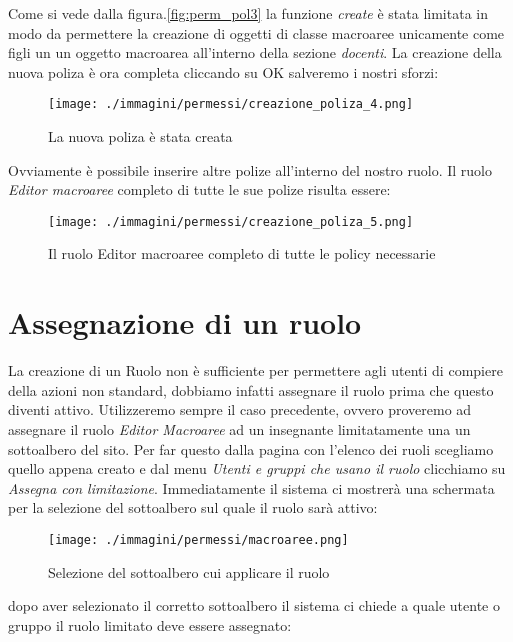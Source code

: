 Come si vede dalla figura.\ref{fig:perm_pol3} la funzione \textsl{create} è stata limitata in modo da permettere la creazione di oggetti di classe macroaree unicamente come figli un un oggetto macroarea all'interno della sezione \textsl{docenti}. La creazione della nuova poliza è ora completa cliccando su OK salveremo i nostri sforzi:
\begin{figure}[H]
 \centering
 \texttt{[image: ./immagini/permessi/creazione\_poliza\_4.png]}
 \caption{La nuova poliza è stata creata}
 \label{fig:perm_pol4}
\end{figure}


Ovviamente è possibile inserire altre polize all'interno del nostro ruolo. Il ruolo \textsl{Editor macroaree} completo di tutte le sue polize risulta essere:
\begin{figure}[H]
 \centering
 \texttt{[image: ./immagini/permessi/creazione\_poliza\_5.png]}
 \caption{Il ruolo Editor macroaree completo di tutte le policy necessarie}
 \label{fig:perm_pol5}
\end{figure}


\section{Assegnazione di un ruolo}

La creazione di un Ruolo non è sufficiente per permettere agli utenti di compiere della azioni non standard, dobbiamo infatti assegnare il ruolo prima che questo diventi attivo. Utilizzeremo sempre il caso precedente, ovvero proveremo ad assegnare il ruolo \textsl{Editor Macroaree} ad un insegnante limitatamente una un sottoalbero del sito.
Per far questo dalla pagina con l'elenco dei ruoli scegliamo quello appena creato e dal menu \emph{Utenti e gruppi che usano il ruolo} clicchiamo su \textsl{Assegna con limitazione}. Immediatamente il sistema ci mostrerà una schermata per la selezione del sottoalbero sul quale il ruolo sarà attivo:

\begin{figure}[H]
 \centering
 \texttt{[image: ./immagini/permessi/macroaree.png]}
 \caption{Selezione del sottoalbero cui applicare il ruolo}
 \label{fig:perm_macro_select}
\end{figure}

dopo aver selezionato il corretto sottoalbero il sistema ci chiede a quale utente o gruppo il ruolo limitato deve essere assegnato:

